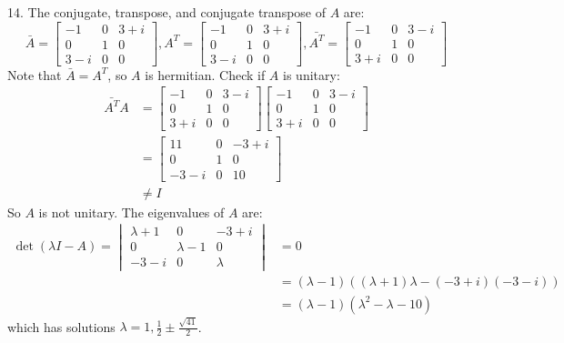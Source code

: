 \documentclass[11pt]{homework}
\begin{document}
14.
The conjugate, transpose, and conjugate transpose of $A$ are:
\begin{equation*}
\bar{A}=
  \begin{bmatrix}
  -1 & 0 &  3+i \\
  0 & 1 & 0 \\
  3-i & 0 & 0
  \end{bmatrix},
A^T=
  \begin{bmatrix}
  -1 & 0 &  3+i \\
  0 & 1 & 0 \\
  3-i & 0 & 0
  \end{bmatrix},
\bar{A^T} =
  \begin{bmatrix}
  -1 & 0 &  3-i \\
  0 & 1 & 0 \\
  3+i & 0 & 0
  \end{bmatrix}
\end{equation*}
Note that $\bar{A}=A^T$, so $A$ is hermitian.
Check if $A$ is unitary:
\begin{align*}
  \bar{A^T}A &= 
  \begin{bmatrix}
  -1 & 0 &  3-i \\
  0 & 1 & 0 \\
  3+i & 0 & 0
  \end{bmatrix}
  \begin{bmatrix}
  -1 & 0 & 3-i \\
  0 & 1 & 0 \\
  3+i & 0 & 0
  \end{bmatrix} \\
  &=
  \begin{bmatrix}
  11 & 0 & -3 +i \\
  0 & 1 & 0 \\
  -3-i & 0 & 10 
  \end{bmatrix} \\
  &\neq I
\end{align*}
So $A$ is not unitary.
The eigenvalues of $A$ are:
\begin{align*}
\det(\lambda I-A) =
  \begin{vmatrix}
  \lambda+1 & 0 & -3+i \\
  0 & \lambda-1 & 0 \\
  -3-i & 0 & \lambda
  \end{vmatrix}
  &= 0\\
  &= (\lambda -1)((\lambda+1)\lambda - (-3+i)(-3-i)) \\
  &= (\lambda -1)(\lambda^2 - \lambda - 10) 
\end{align*}
which has solutions $\lambda = 1, \frac{1}{2} \pm \frac{\sqrt{41}}{2}$.
\end{document}

